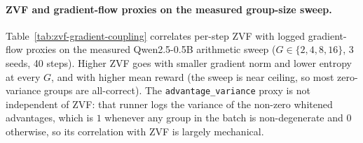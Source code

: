 %

\paragraph{ZVF and gradient-flow proxies on the measured group-size sweep.}
Table~\ref{tab:zvf-gradient-coupling} correlates per-step ZVF with logged
gradient-flow proxies on the measured Qwen2.5-0.5B arithmetic sweep
($G\in\{2,4,8,16\}$, 3 seeds, 40 steps). Higher ZVF goes with smaller gradient
norm and lower entropy at every $G$, and with higher mean reward (the sweep is
near ceiling, so most zero-variance groups are all-correct). The
\texttt{advantage\_variance} proxy is not independent of ZVF: that runner logs the
variance of the non-zero whitened advantages, which is $1$ whenever any group in
the batch is non-degenerate and $0$ otherwise, so its correlation with ZVF is
largely mechanical.



